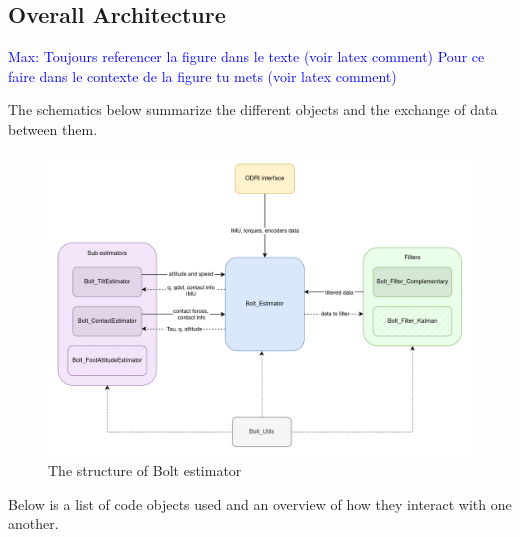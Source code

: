 \documentclass[a4paper,10pt]{article}
\newcommand{\mnaveau}[1]{\textcolor{blue}{Max: #1}}
\begin{document}
\subsection{Overall Architecture}

\mnaveau{
  Toujours referencer la figure dans le texte (voir latex comment)
  Pour ce faire dans le contexte de la figure tu mets (voir latex comment)
}

The schematics below summarize the different objects and the exchange of data between them.
\begin{figure}[H]
\centering
  \includegraphics[width=\linewidth, angle=0, scale=1.1]{./images/Structure_simple.png}
  \caption{The structure of Bolt estimator}
\end{figure}

Below is a list of code objects used and an overview of how they interact with one another.
\end{document}
